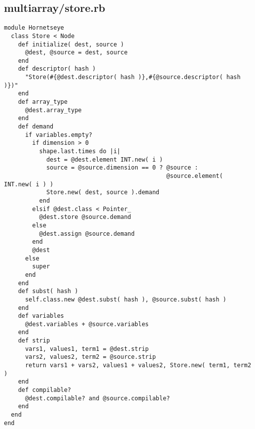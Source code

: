 \subsection{multiarray/store.rb}\label{cha:multiarray-store-rb}
\begin{lstlisting}
module Hornetseye
  class Store < Node
    def initialize( dest, source )
      @dest, @source = dest, source
    end
    def descriptor( hash )
      "Store(#{@dest.descriptor( hash )},#{@source.descriptor( hash )})"
    end
    def array_type
      @dest.array_type
    end
    def demand
      if variables.empty?
        if dimension > 0
          shape.last.times do |i|
            dest = @dest.element INT.new( i )
            source = @source.dimension == 0 ? @source :
                                              @source.element( INT.new( i ) )
            Store.new( dest, source ).demand
          end  
        elsif @dest.class < Pointer_
          @dest.store @source.demand
        else
          @dest.assign @source.demand
        end
        @dest
      else
        super
      end
    end
    def subst( hash )
      self.class.new @dest.subst( hash ), @source.subst( hash )
    end
    def variables
      @dest.variables + @source.variables
    end
    def strip
      vars1, values1, term1 = @dest.strip
      vars2, values2, term2 = @source.strip
      return vars1 + vars2, values1 + values2, Store.new( term1, term2 )
    end
    def compilable?
      @dest.compilable? and @source.compilable?
    end
  end
end
\end{lstlisting}
